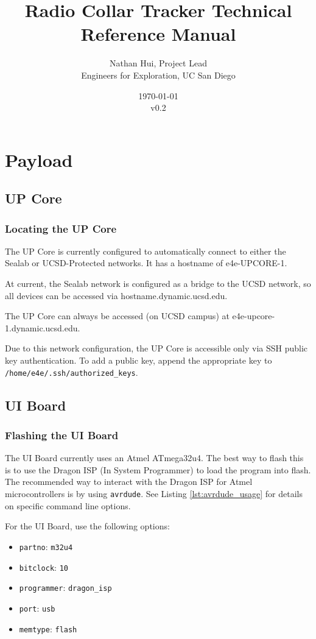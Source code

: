 \documentclass{report}
\title{Radio Collar Tracker Technical Reference Manual}
\author{Nathan Hui, Project Lead\\Engineers for Exploration, UC San Diego}
\date{\today\\v0.2}
\begin{document}
	\maketitle
	\tableofcontents
	\listoffigures
	\listoftables
	\lstlistoflistings
	\chapter{Payload}
		\section{UP Core}
			\subsection{Locating the UP Core}
				The UP Core is currently configured to automatically connect to either the Sealab or UCSD-Protected networks.  It has a hostname of e4e-UPCORE-1.

				At current, the Sealab network is configured as a bridge to the UCSD network, so all devices can be accessed via hostname.dynamic.ucsd.edu.

				The UP Core can always be accessed (on UCSD campus) at e4e-upcore-1.dynamic.ucsd.edu.

				Due to this network configuration, the UP Core is accessible only via SSH public key authentication.  To add a public key, append the appropriate key to \lstinline[language=sh]{/home/e4e/.ssh/authorized_keys}.
		\section{UI Board} \label{sec:ui}
			\subsection{Flashing the UI Board} \label{ssec:flash_ui}
				The UI Board currently uses an Atmel ATmega32u4.  The best way to flash this is to use the Dragon ISP (In System Programmer) to load the program into flash.  The recommended way to interact with the Dragon ISP for Atmel microcontrollers is by using \lstinline[language=sh]{avrdude}.  See Listing \ref{lst:avrdude_usage} for details on specific command line options.

				For the UI Board, use the following options:

				\begin{itemize}
					\item \lstinline{partno}: \lstinline{m32u4}
					\item \lstinline{bitclock}: \lstinline{10}
					\item \lstinline{programmer}: \lstinline{dragon_isp}
					\item \lstinline{port}: \lstinline{usb}
					\item \lstinline{memtype}: \lstinline{flash}
				\end{itemize}
				
\end{document}
